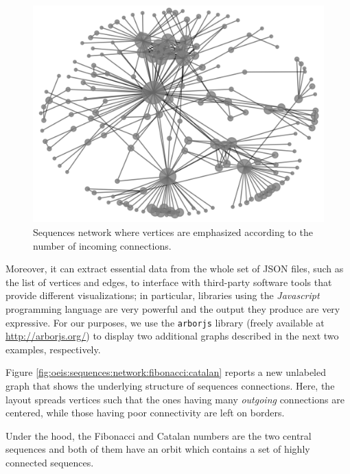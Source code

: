 \begin{figure}
\includegraphics{OEIS/graph1}
\caption{Sequences network where vertices are emphasized according to the
number of incoming connections.}
\label{fig:oeis:sequences:network}
\end{figure}

Moreover, it can extract essential data from the whole set of JSON files, such
as the list of vertices and edges, to interface with third-party software tools
that provide different visualizations; in particular, libraries using the
\textit{Javascript} programming language are very powerful and the output they
produce are very expressive. For our purposes, we use the \verb|arborjs|
library (freely available at \url{http://arborjs.org/}) to display two
additional graphs described in the next two examples, respectively.

\begin{example}
Figure \ref{fig:oeis:sequences:network:fibonacci:catalan} reports a new
unlabeled graph that shows the underlying structure of sequences connections.
Here, the layout spreads vertices such that the ones having many
\textit{outgoing} connections are centered, while those having poor
connectivity are left on borders.

Under the hood, the Fibonacci and Catalan numbers are the two central sequences
and both of them have an orbit which contains a set of highly connected
sequences.
\end{example}

